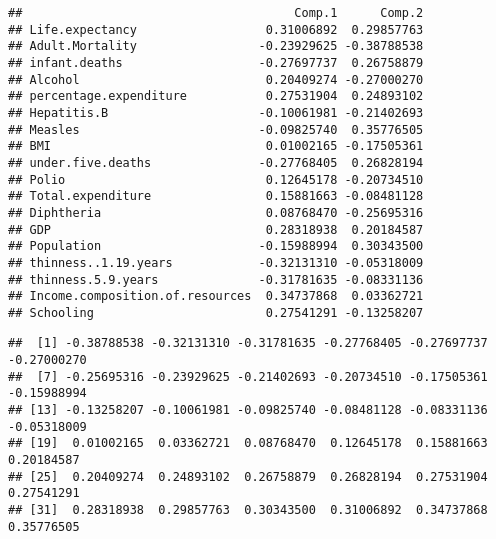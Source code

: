 \documentclass[
]{article}
\newenvironment{Shaded}{\begin{snugshade}}{\end{snugshade}}
\newcommand{\DecValTok}[1]{\textcolor[rgb]{0.00,0.00,0.81}{#1}}
\newcommand{\FunctionTok}[1]{\textcolor[rgb]{0.13,0.29,0.53}{\textbf{#1}}}
\newcommand{\NormalTok}[1]{#1}
\newcommand{\SpecialCharTok}[1]{\textcolor[rgb]{0.81,0.36,0.00}{\textbf{#1}}}
\begin{document}
\begin{verbatim}
##                                      Comp.1      Comp.2
## Life.expectancy                  0.31006892  0.29857763
## Adult.Mortality                 -0.23929625 -0.38788538
## infant.deaths                   -0.27697737  0.26758879
## Alcohol                          0.20409274 -0.27000270
## percentage.expenditure           0.27531904  0.24893102
## Hepatitis.B                     -0.10061981 -0.21402693
## Measles                         -0.09825740  0.35776505
## BMI                              0.01002165 -0.17505361
## under.five.deaths               -0.27768405  0.26828194
## Polio                            0.12645178 -0.20734510
## Total.expenditure                0.15881663 -0.08481128
## Diphtheria                       0.08768470 -0.25695316
## GDP                              0.28318938  0.20184587
## Population                      -0.15988994  0.30343500
## thinness..1.19.years            -0.32131310 -0.05318009
## thinness.5.9.years              -0.31781635 -0.08331136
## Income.composition.of.resources  0.34737868  0.03362721
## Schooling                        0.27541291 -0.13258207
\end{verbatim}

\begin{Shaded}
\end{Shaded}

\begin{verbatim}
##  [1] -0.38788538 -0.32131310 -0.31781635 -0.27768405 -0.27697737 -0.27000270
##  [7] -0.25695316 -0.23929625 -0.21402693 -0.20734510 -0.17505361 -0.15988994
## [13] -0.13258207 -0.10061981 -0.09825740 -0.08481128 -0.08331136 -0.05318009
## [19]  0.01002165  0.03362721  0.08768470  0.12645178  0.15881663  0.20184587
## [25]  0.20409274  0.24893102  0.26758879  0.26828194  0.27531904  0.27541291
## [31]  0.28318938  0.29857763  0.30343500  0.31006892  0.34737868  0.35776505
\end{verbatim}
\end{document}
